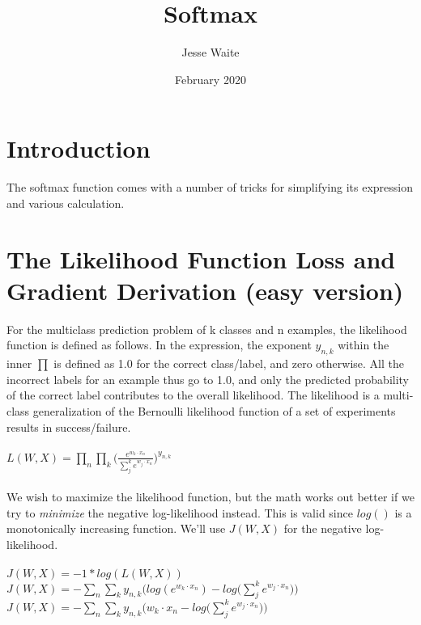 \documentclass{article}
\title{Softmax}
\author{Jesse Waite}
\date{February 2020}
\begin{document}
\maketitle

\section{Introduction}
The softmax function comes with a number of tricks for simplifying its expression and various calculation.



\section{The Likelihood Function Loss and Gradient Derivation (easy version)}

For the multiclass prediction problem of k classes and n examples, the likelihood function is defined as follows. In the expression, the exponent $y_{n,k}$ within the inner $\prod$ is defined as 1.0 for the correct class/label, and zero otherwise. All the incorrect labels for an example thus go to 1.0, and only the predicted probability of the correct label contributes to the overall likelihood. The likelihood is a multi-class generalization of the Bernoulli likelihood function of a set of experiments results in success/failure.
\\ \\

$L(W,X) = \prod_{n} \prod_{k} \Big(\frac{e^{w_{k} \cdot x_{n}}}{\sum_{j}^{k} e^{w_{j} \cdot x_{n}}}\Big)^{y_{n,k}}$ 
\\ \\

We wish to maximize the likelihood function, but the math works out better if we try to \textit{minimize} the negative log-likelihood instead. This is valid since $log()$ is a monotonically increasing function. We'll use $J(W,X)$ for the negative log-likelihood.
\\ \\

$J(W,X) = -1 * log(L(W,X)) $ \\

$J(W,X) = - \sum_{n} \sum_{k} y_{n,k}\Big(log(e^{w_{k} \cdot x_{n}}) - log\big(\sum_{j}^{k} e^{w_{j} \cdot x_{n}}\big)\Big)$  \\

$J(W,X) = - \sum_{n} \sum_{k} y_{n,k}\Big(w_{k} \cdot x_{n} - log\big(\sum_{j}^{k} e^{w_{j} \cdot x_{n}}\big)\Big)$ \\
\end{document}
